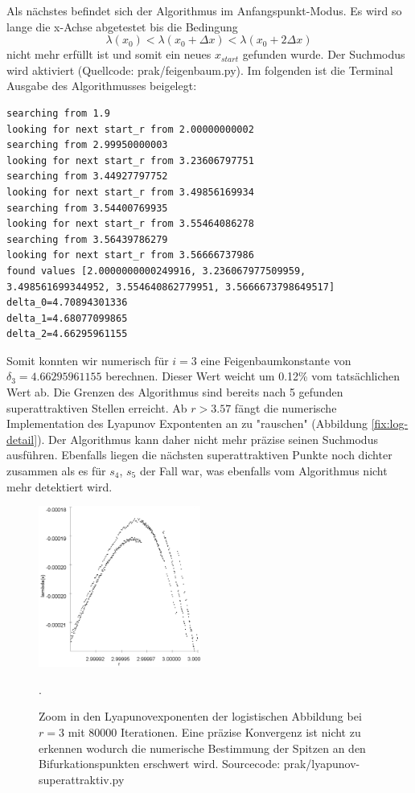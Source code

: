 \documentclass{scrartcl}
\begin{document}
Als nächstes befindet sich der Algorithmus im Anfangspunkt-Modus. Es wird so lange die x-Achse abgetestet bis die Bedingung 
\begin{equation}
\lambda(x_0) < \lambda(x_0 + \Delta x) < \lambda(x_0 + 2\Delta x)
\end{equation}
nicht mehr erfüllt ist und somit ein neues $x_{start}$ gefunden wurde. Der Suchmodus wird aktiviert  (Quellcode: prak/feigenbaum.py).
Im folgenden ist die Terminal Ausgabe des Algorithmusses beigelegt:
\begin{lstlisting}
searching from 1.9
looking for next start_r from 2.00000000002
searching from 2.99950000003
looking for next start_r from 3.23606797751
searching from 3.44927797752
looking for next start_r from 3.49856169934
searching from 3.54400769935
looking for next start_r from 3.55464086278
searching from 3.56439786279
looking for next start_r from 3.56666737986
found values [2.0000000000249916, 3.236067977509959, 3.498561699344952, 3.554640862779951, 3.5666673798649517]
delta_0=4.70894301336
delta_1=4.68077099865
delta_2=4.66295961155
\end{lstlisting}
Somit konnten wir numerisch für $i=3$ eine Feigenbaumkonstante von $\delta_3=4.66295961155$ berechnen. Dieser Wert weicht um 0.12\% vom tatsächlichen Wert ab. Die Grenzen des Algorithmus sind bereits nach 5 gefunden superattraktiven Stellen erreicht. Ab $r>3.57$ fängt die numerische Implementation des Lyapunov Expontenten an zu "rauschen" (Abbildung \ref{fix:log-detail}). Der Algorithmus kann daher nicht mehr präzise seinen Suchmodus ausführen. Ebenfalls liegen die nächsten superattraktiven Punkte noch dichter zusammen als es für $s_4$, $s_5$ der Fall war, was ebenfalls vom Algorithmus nicht mehr detektiert wird. 
\begin{figure}
\centering
\includegraphics[height=200px]{lya-rauschen}
\caption{Zoom in den Lyapunovexponenten der logistischen Abbildung bei $r=3$ mit 80000 Iterationen. 
Eine präzise Konvergenz ist nicht zu erkennen wodurch die numerische Bestimmung der Spitzen an den Bifurkationspunkten erschwert wird. Sourcecode: prak/lyapunov-superattraktiv.py}. 
\label{fig:lya-rauschen}
\end{figure}
\end{document}
